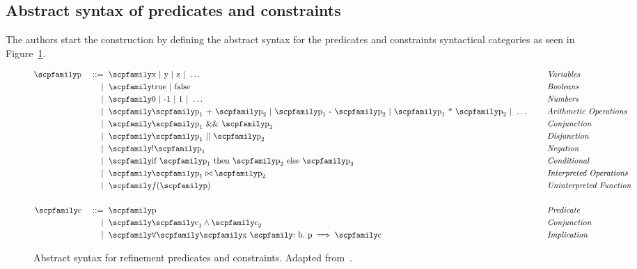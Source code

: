 \documentclass[
  oneside,
  english,
  coorientadorbanca,
  noabntexcite
]{ufsc-thesis-rn46-2019}
\def\bnfdef{::=}
\newcommand{\codett}[1]{\text{\scpfamily#1}}
\newcommand{\code}[1]{\text{\scpfamily\setlength\spaceskip{0.35em}#1}}
\newcommand{\bnfmore}[1]{            & \ & \mid{}    & \ \code{#1}}
\newcommand{\astprod}[2]{\code{#1} & \ & \bnfdef{} & \ \code{#2}}
\newcommand{\astmore}[1]{\bnfmore{#1}}
\newcommand{\typer}[2]{\code{#1 \codett{:} #2}}
\begin{document}
\subsection{Abstract syntax of predicates and constraints}

The authors start the construction by defining the abstract syntax for the predicates and constraints syntactical categories as seen in Figure~\ref{fig:refinement_predicates}.
\begin{figure}[ht]
  \begin{minipage}{\textwidth}
    \begin{alignat*}{4}
      \astprod{p}{x $\mid$ y $\mid$ z $\mid\ \dots$} & \quad & \textit{Variables}              \\
      \astmore{true $\mid$ false}                    & \quad & \textit{Booleans}               \\
      \astmore{0 $\mid$ -1 $\mid$ 1 $\mid\ \dots$ }  & \quad & \textit{Numbers}                \\
      \astmore{%
        $\code{p}_1$ + $\code{p}_2$
        $\mid$ $\code{p}_1$ - $\code{p}_2$
        $\mid$ $\code{p}_1$ * $\code{p}_2$
        $\mid\ \dots$
      }                                              & \quad & \textit{Arithmetic Operations}  \\
      \astmore{$\code{p}_1$ \&\& $\code{p}_2$}       & \quad & \textit{Conjunction}            \\
      \astmore{$\code{p}_1$ || $\code{p}_2$}         & \quad & \textit{Disjunction}            \\
      \astmore{!$\code{p}_1$}                        & \quad & \textit{Negation}               \\
      \astmore{if $\code{p}_1$ then $\code{p}_2$ else $\code{p}_3$}
                                                     & \quad & \textit{Conditional}            \\
      \astmore{$\code{p}_1\bowtie\code{p}_2$}        & \quad & \textit{Interpreted Operations} \\
      \astmore{$f{(\code{p})}$}                      & \quad & \textit{Uninterpreted Function} \\
      \\
      \astprod{c}{p}                                 & \quad & \textit{Predicate}              \\
      \astmore{$\code{c}_1\land\code{c}_2$}          & \quad & \textit{Conjunction}            \\
      \astmore{$\forall\code{\typer{x}{b}.\ p}\implies\code{c}$ }
                                                     & \quad & \textit{Implication}            \\
    \end{alignat*}
  \end{minipage}
  \caption{
    Abstract syntax for refinement predicates and constraints.
    Adapted from~\cite{jhala2020tutorial}.
  }\label{fig:refinement_predicates}
\end{figure}
\end{document}
